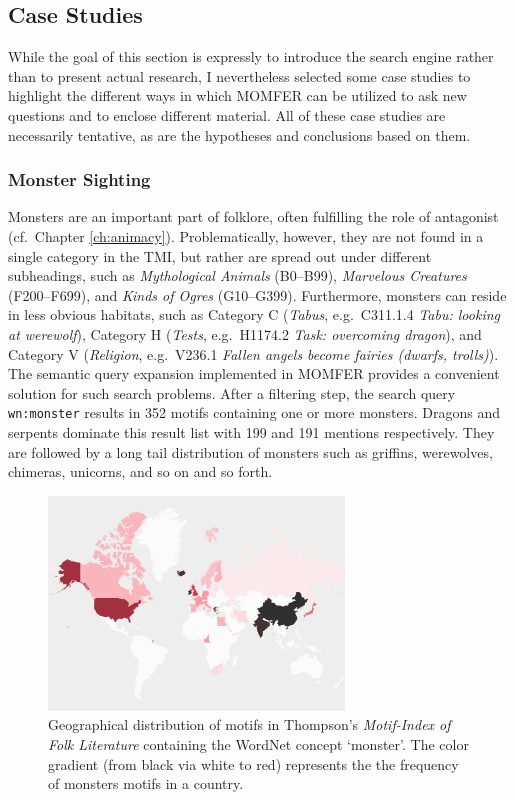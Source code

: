 \subsection{Case Studies}\label{sec:momfer-case-studies}

While the goal of this section is expressly to introduce the search engine rather than to present actual research, I nevertheless selected some case studies to highlight the different ways in which MOMFER can be utilized to ask new questions and to enclose different material. All of these case studies are necessarily tentative, as are the hypotheses and conclusions based on them.

\subsubsection{Monster Sighting}

Monsters are an important part of folklore, often fulfilling the role of antagonist (cf.\ Chapter \ref{ch:animacy}). Problematically, however, they are not found in a single category in the TMI, but rather are spread out under different subheadings, such as \emph{Mythological Animals} (B0--B99), \emph{Marvelous Creatures} (F200--F699), and \emph{Kinds of Ogres} (G10--G399). Furthermore, monsters can reside in less obvious habitats, such as Category C (\emph{Tabus}, e.g.\ C311.1.4 \emph{Tabu: looking at werewolf}), Category H (\emph{Tests}, e.g.\ H1174.2 \emph{Task: overcoming dragon}), and Category V (\emph{Religion}, e.g.\ V236.1 \emph{Fallen angels become fairies (dwarfs, trolls)}). The semantic query expansion implemented in MOMFER provides a convenient solution for such search problems. After a filtering step, the search query \texttt{wn:monster} results in 352 motifs containing one or more monsters. Dragons and serpents dominate this result list with 199 and 191 mentions respectively. They are followed by a long tail distribution of monsters such as griffins, werewolves, chimeras, unicorns, and so on and so forth.

\begin{figure}
\centering
\includegraphics[width=0.7\textwidth]{images/monsters-reduced.pdf}
\caption{Geographical distribution of motifs in Thompson's \emph{Motif-Index of Folk Literature} containing the WordNet concept `monster'. The color gradient (from black via white to red) represents the the frequency of monsters motifs in a country.}
\label{fig:monster-map}
\end{figure}

